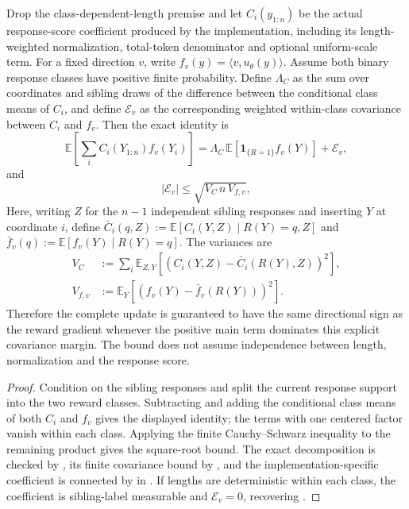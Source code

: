 \begin{proposition}
\label{prop:binary-length-covariance}
Drop the class-dependent-length premise and let $C_i(y_{1:n})$ be the actual
response-score coefficient produced by the implementation, including its
length-weighted normalization, total-token denominator and optional
uniform-scale term. For a fixed direction $v$, write
$f_v(y)=\langle v,u_\theta(y)\rangle$. Assume both binary response classes
have positive finite probability. Define $\Lambda_C$ as the sum over
coordinates and sibling draws of the difference between the conditional
class means of $C_i$, and define
$\mathcal E_v$ as the corresponding weighted within-class covariance between
$C_i$ and $f_v$. Then the exact identity is
\begin{equation*}
 \mathbb E\!\left[\sum_i C_i(Y_{1:n})f_v(Y_i)\right]
   = \Lambda_C\,\mathbb E[\mathbf 1_{\{R=1\}}f_v(Y)] + \mathcal E_v,
\end{equation*}
and
\begin{equation*}
 |\mathcal E_v|\le
 \sqrt{V_C\,n\,V_{f,v}},
\end{equation*}
Here, writing $Z$ for the $n-1$ independent sibling responses and inserting
$Y$ at coordinate $i$, define
$\bar C_i(q,Z):=\mathbb E[C_i(Y,Z)\mid R(Y)=q,Z]$ and
$\bar f_v(q):=\mathbb E[f_v(Y)\mid R(Y)=q]$. The variances are
\begin{align*}
 V_C&:=\sum_i\mathbb E_{Z,Y}
       [(C_i(Y,Z)-\bar C_i(R(Y),Z))^2],\\
 V_{f,v}&:=\mathbb E_Y[(f_v(Y)-\bar f_v(R(Y)))^2].
\end{align*}
Therefore
the complete update is guaranteed to have the same directional sign as the
reward gradient whenever the positive main term dominates this explicit
covariance margin. The bound does not assume independence between length,
normalization and the response score.
\end{proposition}

\begin{proof}
Condition on the sibling responses and split the current response support
into the two reward classes. Subtracting and adding the conditional class
means of both $C_i$ and $f_v$ gives the displayed identity; the terms with
one centered factor vanish within each class. Applying the finite
Cauchy--Schwarz inequality to the remaining product gives the square-root
bound. The exact decomposition is checked by
, its finite covariance bound by
, and the implementation-specific
coefficient is connected by  in
. If lengths are deterministic within each
class, the coefficient is sibling-label measurable and $\mathcal E_v=0$,
recovering .
\end{proof}

